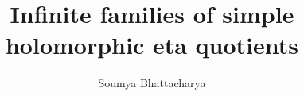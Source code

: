 \documentclass[a4paper,11pt]{amsart}
\begin{document}
\newcommand{\cothre}{Corollary~\ref{17.2Aug}$'$}
\newtheorem*{cne}{Corollary~\ref{15.5Aug}$\mathbf{'}$}
\newcommand{\cnew}{Corollary~\ref{15.5Aug}$'$\hspace{3.5pt}}
\newcommand{\fr}{\mathfrak}
\newcommand{\cl}{\mathcal}
\newcommand{\rad}{\mathrm{rad}}
\newcommand{\ord}{\operatorname{ord}}
\newcommand{\m}{\setminus}
\newcommand{\G}{\Gamma_1}
\newcommand{\GN}{\Gamma_0(N)}
\newcommand{\X}{\widetilde{X}}
\renewcommand{\P}{{\textup{p}}} 
\newcommand{\al}{{\hs\operatorname{al}}}
\newcommand{\p}{p_\text{\tiny (\textit{N})}}
\newcommand{\pN}{p_\text{\tiny\textit{N}}}
\newcommand{\bt}{\mbox{$\raisebox{-0.59ex}
  {${{l}}$}\hspace{-0.215em}\beta\hspace{-0.88em}\raisebox{-0.98ex}{\scalebox{2}
  {$\color{white}.$}}\hspace{-0.416em}\raisebox{+0.88ex}
  {$\color{white}.$}\hspace{0.46em}$}{}}
  \newcommand{\un}{\hs\underline{\hspace{5pt}}\hs}
\newcommand{\U}{u_\textit{\tiny N}}
\newcommand{\Upr}{u_{\textit{\tiny N}^\prime}}
\newcommand{\Up}{u_{\textit{\tiny p}^\textit{\tiny e}}}
\newcommand{\Un}{u_{\textit{\tiny p}_\textit{\tiny 1}^{\textit{\tiny e}_\textit{\tiny 1}}}}
\newcommand{\Um}{u_{\textit{\tiny p}_\textit{\tiny m}^{\textit{\tiny e}_\textit{\tiny m}}}}
\newcommand{\Ut}{u_{\text{\tiny 2}^\textit{\tiny a}}}
\newcommand{\At}{A_{\text{\tiny 2}^\textit{\tiny a}}}
\newcommand{\Uh}{u_{\text{\tiny 3}^\textit{\tiny b}}}
\newcommand{\Ah}{A_{\text{\tiny 3}^\textit{\tiny b}}}
\newcommand{\Uprl}{u_{\textit{\tiny N}_1}}
\newcommand{\Uprlm}{u_{\textit{\tiny N}_i}}
\newcommand{\UM}{u_\textit{\tiny M}}
\newcommand{\UMp}{u_{\textit{\tiny M}_1}}
\newcommand{\w}{\omega_\textit{\tiny N}}
\newcommand{\wm}{\omega_\textit{\tiny M}}
\newcommand{\wa}{\omega_{\text{\tiny N}_\textit{\tiny a}}}
\newcommand{\wma}{\omega_{\text{\tiny M}_\textit{\tiny a}}}
\renewcommand{\P}{{\textup{p}}} 


\title[ %
{\tiny Infinite families of simple holomorphic eta quotients}] %
{Infinite families of simple \\ holomorphic eta quotients} %

\author{Soumya Bhattacharya}
\address 
{Ramakrishna Mission Vivekananda University\\
Belur Math\\
Howrah 711202} %
\end{document}
